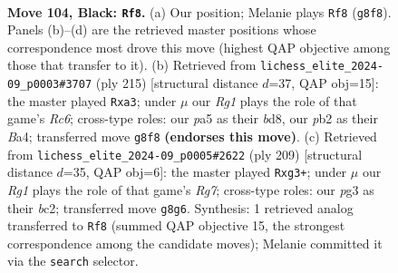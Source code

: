 \documentclass[11pt]{article}
\begin{document}
\begin{figure}[p]\centering
\begin{subfigure}{0.46\textwidth}\centering
\resizebox{\linewidth}{!}{%
\newchessgame
\chessboard[
  setfen={6r1/2k5/p7/P1p2p1p/1p3P1P/4P1PK/1P6/5R2 b - - 20 104},
  showmover=false,
  pgfstyle=straightmove, color=movearrow, markmove={g8-f8}
]}
\caption{}
\end{subfigure}\hfill
\begin{subfigure}{0.46\textwidth}\centering
\resizebox{\linewidth}{!}{%
\newchessgame
\chessboard[
  setfen={3B4/5kp1/8/1p1p3p/b2P1K1P/P1r2PP1/3R4/8 b - - 2 108},
  showmover=false,
  pgfstyle=straightmove, color=movearrow, markmove={c3-a3}
]}
\caption{}
\end{subfigure}
\\[4pt]
\begin{subfigure}{0.46\textwidth}\centering
\resizebox{\linewidth}{!}{%
\newchessgame
\chessboard[
  setfen={k7/8/PPp1p3/4Pp2/3P1Pp1/2K3P1/2B3r1/8 b - - 0 105},
  showmover=false,
  pgfstyle=straightmove, color=movearrow, markmove={g2-g3}
]}
\caption{}
\end{subfigure}\hfill

\caption{\textbf{Move 104, Black: \texttt{Rf8}.} (a) Our position; Melanie plays \texttt{Rf8} (\texttt{g8f8}). Panels (b)--(d) are the retrieved master positions whose correspondence most drove this move (highest QAP objective among those that transfer to it). (b) Retrieved from \texttt{lichess\_elite\_2024-09\_p0003\#3707} (ply 215) [structural distance $d$=37, QAP obj=15]: the master played \texttt{Rxa3}; under $\mu$ our \emph{Rg1} plays the role of that game's \emph{Rc6}; cross-type roles: our \emph{p}a5 as their \emph{b}d8, our \emph{p}b2 as their \emph{B}a4; transferred move \texttt{g8f8} \textbf{(endorses this move)}. (c) Retrieved from \texttt{lichess\_elite\_2024-09\_p0005\#2622} (ply 209) [structural distance $d$=35, QAP obj=6]: the master played \texttt{Rxg3+}; under $\mu$ our \emph{Rg1} plays the role of that game's \emph{Rg7}; cross-type roles: our \emph{p}g3 as their \emph{b}c2; transferred move \texttt{g8g6}. Synthesis: 1 retrieved analog transferred to \texttt{Rf8} (summed QAP objective 15, the strongest correspondence among the candidate moves); Melanie committed it via the \texttt{search} selector.}
\label{fig:thought-m207}
\end{figure}

\clearpage
\end{document}
